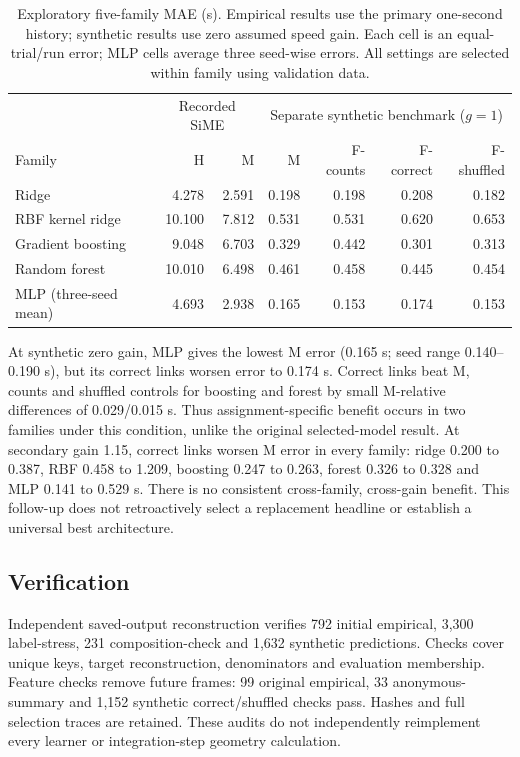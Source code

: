 \documentclass[conference]{IEEEtran}
\begin{document}
\begin{table}[t]\centering
\caption{Exploratory five-family MAE (s). Empirical results use the primary one-second history; synthetic results use zero assumed speed gain. Each cell is an equal-trial/run error; MLP cells average three seed-wise errors. All settings are selected within family using validation data.}\label{tab:families}
\begin{tabular}{lrrrrrr}\toprule
&\multicolumn{2}{c}{Recorded SiME}&\multicolumn{4}{c}{Separate synthetic benchmark ($g=1$)}\\
Family&H&M&M&F-counts&F-correct&F-shuffled\\\midrule
Ridge&4.278&2.591&0.198&0.198&0.208&0.182\\
RBF kernel ridge&10.100&7.812&0.531&0.531&0.620&0.653\\
Gradient boosting&9.048&6.703&0.329&0.442&0.301&0.313\\
Random forest&10.010&6.498&0.461&0.458&0.445&0.454\\
MLP (three-seed mean)&4.693&2.938&0.165&0.153&0.174&0.153\\\bottomrule
\end{tabular}
\end{table}

At synthetic zero gain, MLP gives the lowest M error (0.165 s; seed range 0.140--0.190 s), but its correct links worsen error to 0.174 s. Correct links beat M, counts and shuffled controls for boosting and forest by small M-relative differences of 0.029/0.015 s. Thus assignment-specific benefit occurs in two families under this condition, unlike the original selected-model result. At secondary gain 1.15, correct links worsen M error in every family: ridge 0.200 to 0.387, RBF 0.458 to 1.209, boosting 0.247 to 0.263, forest 0.326 to 0.328 and MLP 0.141 to 0.529 s. There is no consistent cross-family, cross-gain benefit. This follow-up does not retroactively select a replacement headline or establish a universal best architecture.

\subsection{Verification}
Independent saved-output reconstruction verifies 792 initial empirical, 3,300 label-stress, 231 composition-check and 1,632 synthetic predictions. Checks cover unique keys, target reconstruction, denominators and evaluation membership. Feature checks remove future frames: 99 original empirical, 33 anonymous-summary and 1,152 synthetic correct/shuffled checks pass. Hashes and full selection traces are retained. These audits do not independently reimplement every learner or integration-step geometry calculation.
\end{document}
